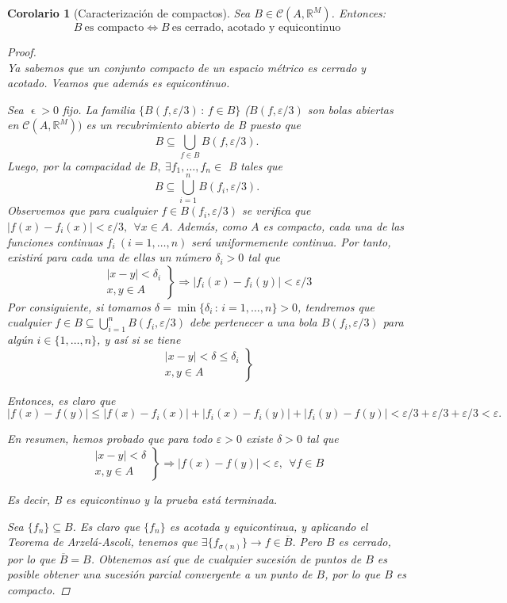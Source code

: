 \documentclass[11pt, a4paper]{article}
\let\epsilon\upvarepsilon
\newcommand{\fn}{\{f_n\}}
\theoremstyle{theorem-style}
\newtheorem{ncor}{Corolario}[section]
\theoremstyle{definition-style}
\theoremstyle{remark-style}
\theoremstyle{example-style}
\begin{document}
\begin{ncor}[Caracterización de compactos] Sea $B \in \mathcal{C}(A,\mathbb{R}^M)$. Entonces: $$B\ \text{es compacto} \iff B \ \text{es cerrado, acotado y equicontinuo}$$

\begin{proof} \hfill \\
	\boxed{\Rightarrow} Ya sabemos que un conjunto compacto de un espacio métrico es cerrado y acotado. Veamos que además es equicontinuo.
	
Sea $\epsilon >0$ fijo. La familia $\{ B(f, \varepsilon/3) \, : \, f\in B\}$ ($B(f, \varepsilon/3)$ son bolas abiertas en $\mathcal{C}(A, \mathbb{R}^M))$ es un recubrimiento abierto de B puesto que $$B\subseteq \bigcup_{f\in B} B(f, \varepsilon/3).$$
Luego, por la compacidad de $B,\ \exists f_1, \dots, f_n \in$ B tales que $$B \subseteq \displaystyle \bigcup_{i=1}^n B(f_i, \varepsilon/3).$$
Observemos que para cualquier $f\in B(f_i, \varepsilon/3)$ se verifica que
$|f(x)-f_i(x)| < \varepsilon/3 , \ \ \forall x\in A$. Además, como $A$ es compacto, cada una de las funciones continuas $f_i \ (i=1,\dots,n)$ será uniformemente continua. Por tanto, existirá para cada una de ellas un número $\delta_i>0$ tal que $$\left. \begin{array}{c} |x-y|<\delta_i \\ x,y\in A \end{array}  \right\} \Rightarrow |f_i(x)-f_i(y)| <\varepsilon/3$$
Por consiguiente, si tomamos $\delta = \min \{\delta_i \, :\, i=1,\dots,n\} >0$, tendremos que cualquier $f\in B \subseteq \bigcup_{i=1}^n B(f_i, \varepsilon/3)$ debe pertenecer a una bola $B(f_i, \varepsilon/3)$ para algún $i\in\{1,\dots ,n\}$, y así si se tiene $$\left. \begin{array}{c} |x-y|<\delta \leq \delta_i \\ x,y\in A \end{array}  \right\}$$ 

Entonces, es claro que $\displaystyle |f(x)-f(y)| \le |f(x)-f_i(x)|+|f_i(x)-f_i(y)|+|f_i(y)-f(y)| < \varepsilon/3+\varepsilon/3+\varepsilon/3<\varepsilon.$

En resumen, hemos probado que para todo $\varepsilon >0$ existe $\delta >0$ tal que $$ \left. \begin{array}{c} |x-y|<\delta  \\ x,y\in A \end{array}  \right\} \Rightarrow |f(x)-f(y)| <\varepsilon , \ \ \forall f\in B$$

Es decir, B es equicontinuo y la prueba está terminada.

    \boxed{\Leftarrow} Sea $\fn \subseteq B$. Es claro que $\fn$ es acotada y equicontinua, y aplicando el \textit{Teorema de Arzelá-Ascoli}, tenemos que $\exists \{f_{\sigma(n)}\} \to f \in \overline{B}$. Pero $B$ es cerrado, por lo que $\overline{B} = B$. Obtenemos así que de cualquier sucesión de puntos de $B$ es posible obtener una sucesión parcial convergente a un punto de $B$, por lo que $B$ es compacto.
\end{proof}
	
\end{ncor}
\end{document}
